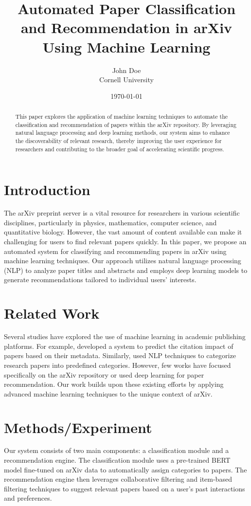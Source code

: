 \documentclass{article}
\title{Automated Paper Classification and Recommendation in arXiv Using Machine Learning}
\author{John Doe \\ Cornell University}
\date{\today}
\begin{document}
\maketitle

\begin{abstract}
This paper explores the application of machine learning techniques to automate the classification and recommendation of papers within the arXiv repository. By leveraging natural language processing and deep learning methods, our system aims to enhance the discoverability of relevant research, thereby improving the user experience for researchers and contributing to the broader goal of accelerating scientific progress.
\end{abstract}

\section{Introduction}
The arXiv preprint server is a vital resource for researchers in various scientific disciplines, particularly in physics, mathematics, computer science, and quantitative biology. However, the vast amount of content available can make it challenging for users to find relevant papers quickly. In this paper, we propose an automated system for classifying and recommending papers in arXiv using machine learning techniques. Our approach utilizes natural language processing (NLP) to analyze paper titles and abstracts and employs deep learning models to generate recommendations tailored to individual users' interests.

\section{Related Work}
Several studies have explored the use of machine learning in academic publishing platforms. For example, \cite{Chen2019} developed a system to predict the citation impact of papers based on their metadata. Similarly, \cite{Gupta2020} used NLP techniques to categorize research papers into predefined categories. However, few works have focused specifically on the arXiv repository or used deep learning for paper recommendation. Our work builds upon these existing efforts by applying advanced machine learning techniques to the unique context of arXiv.

\section{Methods/Experiment}
Our system consists of two main components: a classification module and a recommendation engine. The classification module uses a pre-trained BERT model fine-tuned on arXiv data to automatically assign categories to papers. The recommendation engine then leverages collaborative filtering and item-based filtering techniques to suggest relevant papers based on a user's past interactions and preferences.
\end{document}
